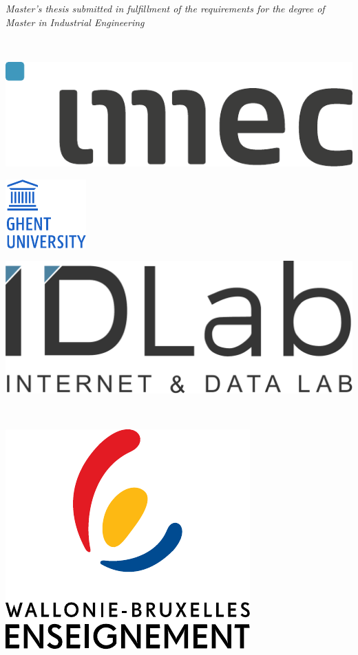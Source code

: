 \begin{titlepage}
\begin{center}
    \parbox{100mm}{\textit{Master's thesis submitted in fulfillment of the
        requirements for the degree of Master in Industrial Engineering}}\\[1cm]

    \begin{minipage}[c]{0.3\textwidth}
      \centering
      \includegraphics[width=.6\linewidth]{img/logo/imec}
    \end{minipage}
    \hfill
    \begin{minipage}[c]{0.3\textwidth}
      \centering
      \includegraphics[width=.6\linewidth]{img/logo/ugent}
    \end{minipage}
    \hfill
    \begin{minipage}[c]{0.3\textwidth}
      \centering
      \includegraphics[width=.6\linewidth]{img/logo/idlab}
    \end{minipage}\\[1.5cm]
    \begin{minipage}[c]{0.3\textwidth}
      \centering
      \includegraphics[width=.5\linewidth]{img/logo/wbe_vertical}

\end{minipage}
\end{center}
\end{titlepage}
